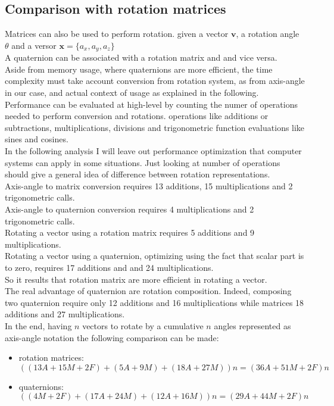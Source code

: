 \subsection{Comparison with rotation matrices}
Matrices can also be used to perform rotation. \cite{Eberly2016RotationRA} given a vector $\boldsymbol{v}$, a rotation angle $\theta$ and a versor $\boldsymbol{x}=\{a_x, a_y, a_z\}$  \\
A quaternion can be associated with a rotation matrix and and vice versa. \cite{amslaurea6701,Eberly2016RotationRA} \\
Aside from memory usage, where quaternions are more efficient, the time complexity must take account conversion from rotation system, as from axis-angle in our case, and actual context of usage as explained in the following.  \\
Performance can be evaluated at high-level by counting the numer of operations needed to perform conversion and rotations. operations like additions or subtractions, multiplications, divisions and trigonometric function evaluations like sines and cosines. \\
In the following analysis I will leave out performance optimization that computer systems can apply in some situations. Just looking at number of operations should give a general idea of difference between rotation representations. \\
Axis-angle to matrix conversion requires 13 additions, 15 multiplications and 2 trigonometric calls. \\
Axis-angle to quaternion conversion requires 4 multiplications and 2 trigonometric calls. \\
Rotating a vector using a rotation matrix requires 5 additions and 9 multiplications. \\
Rotating a vector using a quaternion, optimizing using the fact that scalar part is to zero, requires 17 additions and and 24 multiplications. \\
So it results that rotation matrix are more efficient in rotating a vector. \\
The real advantage of quaternion are rotation composition. 
Indeed, composing two quaternion require only 12 additions and 16 multiplications while matrices 18 additions and 27 multiplications. \\
In the end, having $n$ vectors to rotate by a cumulative $n$ angles represented as axis-angle notation the following comparison can be made:
\begin{itemize}
\item rotation matrices: ${((13A + 15M + 2F) + (5A + 9M) + (18A + 27M))n} = {(36A + 51M + 2F)n}$
\item quaternions: ${((4M + 2F) + (17A + 24M) + (12A + 16M))n} = {(29A + 44M + 2F)n}$
\end{itemize}

